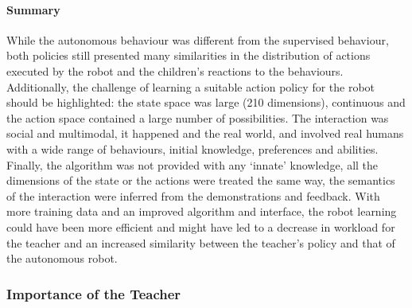 

\paragraph{Summary}

While the autonomous behaviour was different from the supervised behaviour, both policies still presented many similarities in the distribution of actions executed by the robot and the children's reactions to the behaviours. Additionally, the challenge of learning a suitable action policy for the robot should be highlighted: the state space was large (210 dimensions), continuous and the action space contained a large number of possibilities. The interaction was social and multimodal, it happened and the real world, and involved real humans with a wide range of behaviours, initial knowledge, preferences and abilities. Finally, the algorithm was not provided with any `innate' knowledge, all the dimensions of the state or the actions were treated the same way, the semantics of the interaction were inferred from the demonstrations and feedback. With more training data and an improved algorithm and interface, the robot learning could have been more efficient and might have led to a decrease in workload for the teacher and an increased similarity between the teacher's policy and that of the autonomous robot. 

\subsubsection{Importance of the Teacher}

